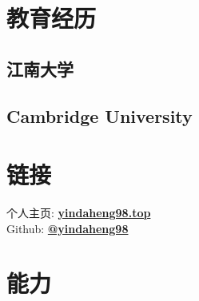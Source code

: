 \documentclass[]{deedy-resume-openfont}
\begin{document}
%
%

%
%

%
%

\begin{minipage}[t]{0.25\textwidth}


	\section{教育经历}
	\subsection{江南大学}
    \sectionsep
    \subsection{Cambridge University}
    \sectionsep
    

	\section{链接}
	个人主页:  \href{http://yindaheng98.top:8888}{\bf yindaheng98.top} \\
	Github: \href{https://github.com/yindaheng98}{\bf @yindaheng98} \\
	\sectionsep




	\section{能力}

\end{minipage}
\end{document}
